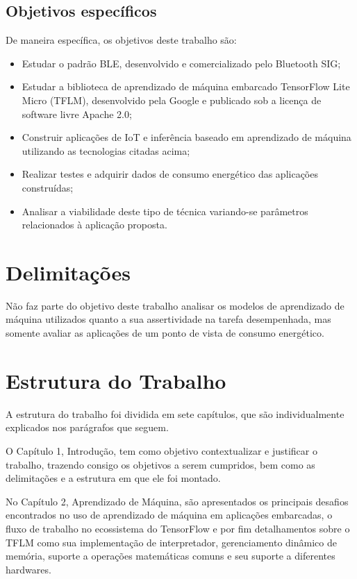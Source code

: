 \documentclass[a5paper]{ufsc-thesis}  %
\begin{document}
\subsection{Objetivos específicos}
De maneira específica, os objetivos deste trabalho  são:
\begin{itemize}
    \item Estudar o padrão BLE, desenvolvido e comercializado pelo Bluetooth SIG;
    \item Estudar a biblioteca de aprendizado de máquina embarcado TensorFlow Lite Micro (TFLM), desenvolvido pela Google e publicado sob a licença de software livre Apache 2.0;
    \item Construir aplicações de IoT e inferência baseado em aprendizado de máquina utilizando as tecnologias citadas acima;
    \item Realizar testes e adquirir dados de consumo energético das aplicações construídas;
    \item Analisar a viabilidade deste tipo de técnica variando-se parâmetros relacionados à aplicação proposta.
\end{itemize}

\section{Delimitações}
Não faz parte do objetivo deste trabalho analisar os modelos de aprendizado de máquina utilizados quanto a sua assertividade na tarefa desempenhada, mas somente avaliar as aplicações de um ponto de vista de consumo energético.

\section{Estrutura do Trabalho}

A estrutura do trabalho foi dividida em sete capítulos, que são individualmente explicados nos parágrafos que seguem.

O Capítulo 1, Introdução, tem como objetivo contextualizar e justificar o trabalho, trazendo consigo os objetivos a serem cumpridos, bem como as delimitações e a estrutura em que ele foi montado.

No Capítulo 2, Aprendizado de Máquina, são apresentados os principais desafios encontrados no uso de aprendizado de máquina em aplicações embarcadas, o fluxo de trabalho  no ecossistema do TensorFlow e por fim detalhamentos sobre o TFLM como sua implementação de interpretador, gerenciamento dinâmico de memória, suporte a operações matemáticas comuns e seu suporte a diferentes hardwares.
\end{document}
